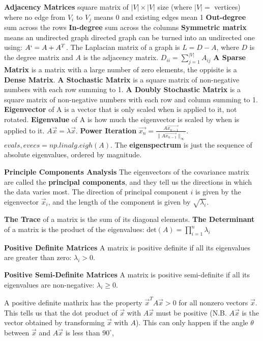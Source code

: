 \documentclass{article}
\begin{document}
\textbf{Adjacency Matrices} square matrix of $|V| \times |V|$ size (where $|V| =$ vertices) where no edge from $V_i$ to $V_j$ means 0 and existing edges mean 1
\textbf{Out-degree} sum across the rows
\textbf{In-degree} sum across the columns
\textbf{Symmetric matrix} means an undirected graph
directed graph can be turned into an undirected one using: $A` = A + A^T$.
The Laplacian matrix of a graph is $L = D - A$, where $D$ is the degree matrix and $A$ is the adjacency matrix.
$D_{ii} = \sum_{j=1}^{|V|} A_{ij}$
\textbf{A Sparse Matrix} is a matrix with a large number of zero elements, the oppisite is a \textbf{Dense Matrix}.
\textbf{A Stochastic Matrix} is a square matrix of non-negative numbers with each row summing to 1.
\textbf{A Doubly Stochastic Matrix} is a square matrix of non-negative numbers with each row and column summing to 1.
\textbf{Eigenvector} of A is a vector that is only scaled when is applied to it, not rotated.
\textbf{Eigenvalue} of A is how much the eigenvector is scaled by when is applied to it.
$A\vec{x} = \lambda  \vec{x}$.
\textbf{Power Iteration}
$\vec{x_n} = \frac{A \vec{x_{n-1}}}{\|A\vec{x_{n-1}}\|_\infty}$.
$evals, evecs = np.linalg.eigh(A)$.
The \textbf{eigenspectrum} is just the sequence of absolute eigenvalues, ordered by magnitude.

\textbf{Principle Components Analysis}
The eigenvectors of the covariance matrix are called the \textbf{principal components}, and they tell us the
directions in which the data varies most.
The direction of principal component $i$ is given by the eigenvector $\vec{x}_i$, and the length of the
component is given by $\sqrt{\lambda_i}$.

\textbf{The Trace} of a matrix is the sum of its diagonal elements.
\textbf{The Determinant} of a matrix is the product of the eigenvalues: $\text{det}(A) = \prod_{i=1}^n \lambda_i$

\textbf{Positive Definite Matrices}
A matrix is positive definite if all its eigenvalues are greater than zero: $\lambda_i > 0$.

\textbf{Positive Semi-Definite Matrices}
A matrix is positive semi-definite if all its eigenvalues are non-negative: $\lambda_i \geq 0$.

A positive definite mathrix has the property $\vec{x}^T A \vec{x} > 0$ for all nonzero vectors $\vec{x}$.
This tells us that the dot product of $\vec{x}$ with $A \vec{x}$ must be positive
(N.B. $A \vec{x}$ is the vector obtained by transforming $\vec{x}$ with $A$).
This can only happen if the angle $\theta$ between $\vec{x}$ and $A \vec{x}$ is less than $90^\circ$,
\end{document}
